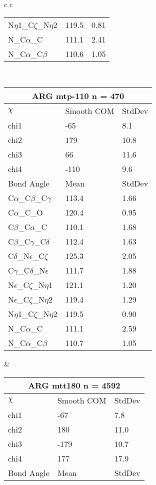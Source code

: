 \begin{longtable}{ c c }
\begin{tabular}{ l l l }
  N$\eta$1\_C$\zeta$\_N$\eta$2 & 119.5 & 0.81\\
  N\_C$\alpha$\_C & 111.1 & 2.41\\
  N\_C$\alpha$\_C$\beta$ & 110.6 & 1.05\\
  \bottomrule
  \end{tabular}
  \\
  \begin{tabular}{ l l l }
  \toprule
  \multicolumn{3}{c}{ARG \textbf{mtp-110} n = 470} \\ \toprule
  $\chi$       & Smooth COM & StdDev \\ \midrule
  chi1 & -65 & 8.1 \\ 
  chi2 & 179 & 10.8 \\ 
  chi3 & 66 & 11.6 \\ 
  chi4 & -110 & 9.6 \\ \midrule
  Bond Angle   & Mean     & StdDev \\ \midrule
  C$\alpha$\_C$\beta$\_C$\gamma$ & 113.4 & 1.66\\
  C$\alpha$\_C\_O & 120.4 & 0.95\\
  C$\beta$\_C$\alpha$\_C & 110.1 & 1.68\\
  C$\beta$\_C$\gamma$\_C$\delta$ & 112.4 & 1.63\\
  C$\delta$\_N$\epsilon$\_C$\zeta$ & 125.3 & 2.05\\
  C$\gamma$\_C$\delta$\_N$\epsilon$ & 111.7 & 1.88\\
  N$\epsilon$\_C$\zeta$\_N$\eta$1 & 121.1 & 1.20\\
  N$\epsilon$\_C$\zeta$\_N$\eta$2 & 119.4 & 1.29\\
  N$\eta$1\_C$\zeta$\_N$\eta$2 & 119.5 & 0.90\\
  N\_C$\alpha$\_C & 111.1 & 2.59\\
  N\_C$\alpha$\_C$\beta$ & 110.7 & 1.05\\
  \bottomrule
  \end{tabular}
  &
  \begin{tabular}{ l l l }
  \toprule
  \multicolumn{3}{c}{ARG \textbf{mtt180} n = 4592} \\ \toprule
  $\chi$       & Smooth COM & StdDev \\ \midrule
  chi1 & -67 & 7.8 \\ 
  chi2 & 180 & 11.0 \\ 
  chi3 & -179 & 10.7 \\ 
  chi4 & 177 & 17.9 \\ \midrule
  Bond Angle   & Mean     & StdDev \\ \midrule

\end{tabular}
\end{longtable}

